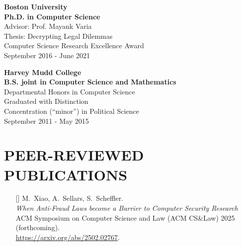 \documentclass{res}
\begin{document}
\begin{resume}
    \textbf{Boston University} \\
    \textbf{Ph.D. in Computer Science} \\
    Advisor: Prof. Mayank Varia \\
    Thesis: Decrypting Legal Dilemmas \\
    Computer Science Research Excellence Award \\
    September 2016 - June 2021

    \textbf{Harvey Mudd College} \\
    \textbf{B.S. joint in Computer Science and Mathematics}  \\
    Departmental Honors in Computer Science \\
    Graduated with Distinction \\
    Concentration (``minor'') in Political Science \\
    September 2011 - May 2015

\section{PEER-REVIEWED PUBLICATIONS}
\vspace{0.25in}

\setcounter{citctr}{1}
\edef\fraudethics{[\arabic{citctr}]}
\edef\eeegroup{[\arabic{citctr}]}
\edef\csamimprovements{[\arabic{citctr}]}
\edef\eeesok{[\arabic{citctr}]}
\edef\foregoneVerif{[\arabic{citctr}]}
\edef\copyrightMDL{[\arabic{citctr}]}
\edef\turboikos{[\arabic{citctr}]}
\edef\booligero{[\arabic{citctr}]}
\edef\foregoneconclusion{[\arabic{citctr}]}
\edef\privateTranslation{[\arabic{citctr}]}
\edef\AEC{[\arabic{citctr}]}
\edef\pullingblocksJIP{[\arabic{citctr}]}
\edef\devicefingerprinting{[\arabic{citctr}]}
\edef\pullingblocks{[\arabic{citctr}]}
\edef\fairsibility{[\arabic{citctr}]}
\edef\emailspam{[\arabic{citctr}]}


\begin{itemize}
\item[\fraudethics] M.~Xiao, A.~Sellars, S.~Scheffler. \\
\emph{When Anti-Fraud Laws become a Barrier to Computer Security Research} \\
ACM Symposium on Computer Science and Law (ACM CS\&Law) 2025 (forthcoming). \\
\url{https://arxiv.org/abs/2502.02767}.


\end{itemize}
\end{resume}
\end{document}
